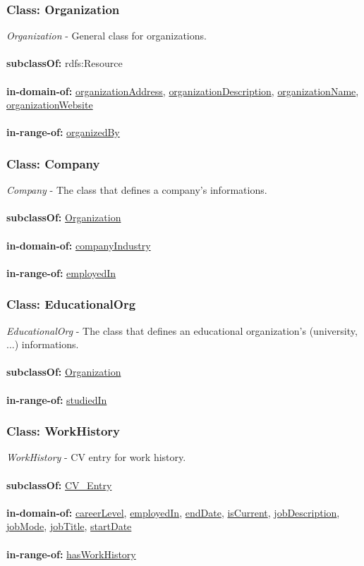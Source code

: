 \documentclass[a4paper,12pt]{article}
\numberwithin{equation}{section}
\begin{document}
\subsubsection{Class: Organization}\hypertarget{Organization}{}
\textit{Organization} - General class for organizations.
\\\\
\textbf{subclassOf:} rdfs:Resource
\\\\
\textbf{in-domain-of:} \hyperlink{organizationAddress}{organizationAddress}, \hyperlink{organizationDescription}{organizationDescription}, \hyperlink{organizationName}{organizationName}, \hyperlink{organizationWebsite}{organizationWebsite}
\\\\
\textbf{in-range-of:} \hyperlink{organizedBy}{organizedBy}

\subsubsection{Class: Company}\hypertarget{Company}{}
\textit{Company} - The class that defines a company's informations.
\\\\
\textbf{subclassOf:} \hyperlink{Organization}{Organization}
\\\\
\textbf{in-domain-of:} \hyperlink{companyIndustry}{companyIndustry}
\\\\
\textbf{in-range-of:} \hyperlink{employedIn}{employedIn}

\subsubsection{Class: EducationalOrg}\hypertarget{EducationalOrg}{}
\textit{EducationalOrg} - The class that defines an educational organization's (university, ...) informations.
\\\\
\textbf{subclassOf:} \hyperlink{Organization}{Organization}
\\\\
\textbf{in-range-of:} \hyperlink{studiedIn}{studiedIn}

\subsubsection{Class: WorkHistory}\hypertarget{WorkHistory}{}
\textit{WorkHistory} - CV entry for work history.
\\\\
\textbf{subclassOf:} \hyperlink{CV\_Entry}{CV\_Entry}
\\\\
\textbf{in-domain-of:} \hyperlink{careerLevel}{careerLevel}, \hyperlink{employedIn}{employedIn}, \hyperlink{endDate}{endDate}, \hyperlink{isCurrent}{isCurrent}, \hyperlink{jobDescription}{jobDescription}, \hyperlink{jobMode}{jobMode}, \hyperlink{jobTitle}{jobTitle}, \hyperlink{startDate}{startDate} 
\\\\
\textbf{in-range-of:} \hyperlink{hasWorkHistory}{hasWorkHistory}
\end{document}
